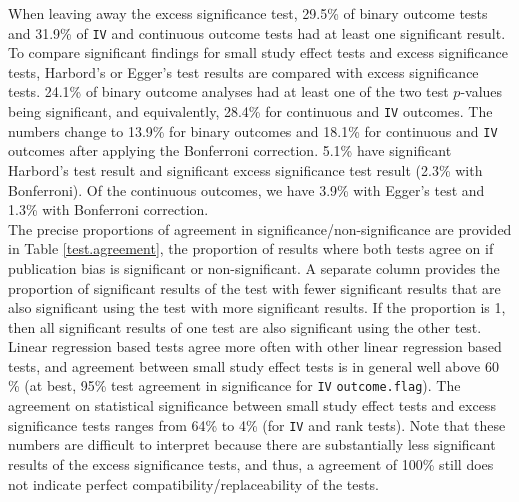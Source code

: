 \documentclass[11pt,a4paper,twoside]{book}\usepackage[]{graphicx}\usepackage[]{color}
\begin{document}
When leaving away the excess significance test, 29.5\% of binary outcome tests and 31.9\% of \texttt{IV} and continuous outcome tests had at least one significant result. 
To compare significant findings for small study effect tests and excess significance tests, Harbord's or Egger's test results are compared with excess significance tests. 24.1\% of binary outcome analyses had at least one of the two test $p$-values being significant, and equivalently, 28.4\% for continuous and \texttt{IV} outcomes. The numbers change to 13.9\% for binary outcomes and 18.1\% for continuous and \texttt{IV} outcomes after applying the Bonferroni correction. 5.1\% have significant Harbord's test result and significant excess significance test result  (2.3\% with Bonferroni). Of the continuous outcomes, we have 3.9\% with Egger's test and 1.3\% with Bonferroni correction. \\
The precise proportions of agreement in significance/non-significance are provided in Table \ref{test.agreement}, \ie the proportion of results where both tests agree on if publication bias is significant or non-significant. A separate column provides the proportion of significant results of the test with fewer significant results that are also significant using the test with more significant results. If the proportion is 1, then all significant results of one test are also significant using the other test. \\
Linear regression based tests agree more often with other linear regression based tests, and agreement between small study effect tests is in general well above 60 \% (at best, 95\% test agreement in significance for \texttt{IV} \texttt{outcome.flag}). The agreement on statistical significance between small study effect tests and excess significance tests ranges from 64\% to 4\% (for \texttt{IV} and rank tests). Note that these numbers are difficult to interpret because there are substantially less significant results of the excess significance tests, and thus, a agreement of 100\% still does not indicate perfect compatibility/replaceability of the tests.
\end{document}
